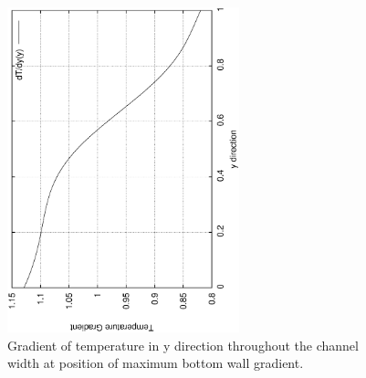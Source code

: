 \documentclass[a4paper,10pt]{article}
\begin{document}
\begin{enumerate}[I]
\begin{figure}
  \centering
  \includegraphics[width=0.6\textwidth, angle = -90]{../plots/gradient/gradientx.eps}
  \caption{Gradient of temperature in y direction throughout the channel width at position of maximum bottom wall gradient.}                
  \label{gradientx}
\end{figure}


\end{enumerate}

\end{document}
